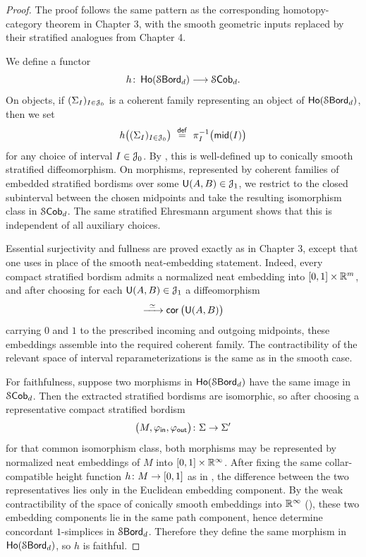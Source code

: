 \begin{proof}
    The proof follows the same pattern as the corresponding homotopy-category theorem in Chapter 3, with the smooth geometric inputs replaced by their stratified analogues from Chapter 4.

    We define a functor
    \begin{equation}
        h\colon \operatorname{\sf Ho}(\operatorname{\mathcal S\mathsf{Bord}}_d) \longrightarrow \mathcal S\mathsf{Cob}_d.
    \end{equation}
    On objects, if $(\Sigma_I)_{I\in \mathcal J_0}$ is a coherent family representing an object of $\operatorname{\sf Ho}(\operatorname{\mathcal S\mathsf{Bord}}_d)$, then we set
    \begin{equation}
        h\big((\Sigma_I)_{I\in \mathcal J_0}\big) \,\, \overset{\sf def}{=} \,\, \pi_I^{-1}\big(\mathsf{mid}(I)\big)
    \end{equation}
    for any choice of interval $I\in \mathcal J_0$. By , this is well-defined up to conically smooth stratified diffeomorphism. On morphisms, represented by coherent families of embedded stratified bordisms over some $\mathsf U(A,B)\in \mathcal J_1$, we restrict to the closed subinterval between the chosen midpoints and take the resulting isomorphism class in $\mathcal S\mathsf{Cob}_d$. The same stratified Ehresmann argument shows that this is independent of all auxiliary choices.

    Essential surjectivity and fullness are proved exactly as in Chapter 3, except that one uses  in place of the smooth neat-embedding statement. Indeed, every compact stratified bordism admits a normalized neat embedding into $[0,1]\times \mathbb R^m$, and after choosing for each $\mathsf U(A,B)\in \mathcal J_1$ a diffeomorphism
    \begin{equation}
        [0,1] \xra{\,\,\,\simeq\,\,\,} \core\big(\sU(A,B)\big)
    \end{equation}
    carrying $0$ and $1$ to the prescribed incoming and outgoing midpoints, these embeddings assemble into the required coherent family. The contractibility of the relevant space of interval reparameterizations is the same as in the smooth case.

    For faithfulness, suppose two morphisms in $\operatorname{\sf Ho}(\operatorname{\mathcal S\mathsf{Bord}}_d)$ have the same image in $\mathcal S\mathsf{Cob}_d$. Then the extracted stratified bordisms are isomorphic, so after choosing a representative compact stratified bordism
    \begin{equation}
        \big(M,\varphi_{\sf in},\varphi_{\sf out}\big)\colon \Sigma \rightarrow \Sigma'
    \end{equation}
    for that common isomorphism class, both morphisms may be represented by normalized neat embeddings of $M$ into $[0,1] \times \mathbb R^{\operatorname{\infty}}$. After fixing the same collar-compatible height function $h \colon M \rightarrow [0,1]$ as in , the difference between the two representatives lies only in the Euclidean embedding component. By the weak contractibility of the space of conically smooth embeddings into $\mathbb R^{\operatorname{\infty}}$ (), these two embedding components lie in the same path component, hence determine concordant $1$-simplices in $\operatorname{\mathcal S\mathsf{Bord}}_{d}$. Therefore they define the same morphism in $\operatorname{\sf Ho}(\operatorname{\mathcal S\mathsf{Bord}}_{d})$, so $h$ is faithful.


\end{proof}
